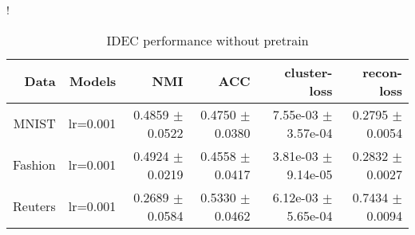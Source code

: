 \begin{table}[h]
\caption{IDEC performance without pretrain}\label{tab:pw}
\resizebox{\columnwidth}!{
\begin{tabular}{ | r | r | r | r | r | r |}
\hline
Data & Models & NMI & ACC & cluster-loss & recon-loss  \\ \hline 
MNIST & lr=0.001 & 0.4859 $\pm$ 0.0522 & 0.4750 $\pm$ 0.0380 & 7.55e-03 $\pm$ 3.57e-04 & 0.2795 $\pm$ 0.0054 \\ \hline 
Fashion & lr=0.001 & 0.4924 $\pm$ 0.0219 & 0.4558 $\pm$ 0.0417 & 3.81e-03 $\pm$ 9.14e-05 & 0.2832 $\pm$ 0.0027 \\ \hline 
Reuters & lr=0.001 & 0.2689 $\pm$ 0.0584 & 0.5330 $\pm$ 0.0462 & 6.12e-03 $\pm$ 5.65e-04 & 0.7434 $\pm$ 0.0094 \\ 
\hline
\end{tabular}
}
\end{table}